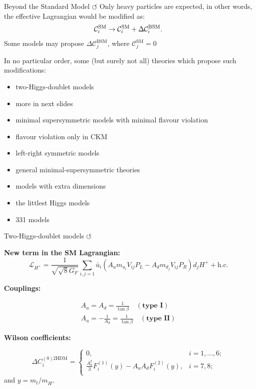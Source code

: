 \documentclass[xcolor=dvipsnames]{beamer}
\begin{document}
\begin{frame}{Beyond the Standard Model \hyperlink{frame:A}{$\circlearrowleft$}}
   \scriptsize
   Only heavy particles are expected, in other words, the effective Lagrangian would be modified as:
   \begin{equation}\nonumber
      \mathcal{C}_i^{\mathrm{SM}} \rightarrow \mathcal{C}_i^{\mathrm{SM}} + \Delta\mathcal{C}_i^{\mathrm{BSM}}.
   \end{equation}
   Some models may propose $\Delta\mathcal{C}_j^{\mathrm{BSM}}$, where $\mathcal{C}_j^{\mathrm{SM}}=0$

\vspace{10pt}
   In no particular order, some (but surely not all) theories which propose such modifications:
   \begin{itemize}
      \item two-Higgs-doublet models 
      \item[\ra] more in next slides
      \item minimal supersymmetric models with minimal flavour violation
      \item[\ra] flavour violation only in CKM
      \item left-right symmetric models
      \item general minimal-supersymmetric theories
      \item models with extra dimensions
      \item the littlest Higgs models
      \item 331 models
   \end{itemize}
\end{frame}

\begin{frame}{Two-Higgs-doublet models \hyperlink{frame:A}{$\circlearrowleft$}}

   \scriptsize

   \textbf{New term in the SM Lagrangian:}
   \begin{equation*}
      \mathcal{L}_{H^+} = \frac{1}{\sqrt{\sqrt8G_F}} \sum_{i,j=1} \bar{u}_i (A_u m_{u_i}V_{ij}P_L - A_d m_{d_j}V_{ij}P_R)d_jH^+ + \mathrm{h.c}.
  \end{equation*}

  \textbf{Couplings:}

\begin{align*}
A_u = A_d = \frac{1}{\tan\beta} \quad (\textbf{type I})\\
A_u = - \frac{1}{A_d} = \frac{1}{\tan\beta} \quad  (\textbf{type II})
\end{align*}

\textbf{Wilson coefficients:}

\begin{equation*}\label{eq:partial_wilson_2hdm}
   \Delta C_i^{(0)\text{2HDM}} = 
   \begin{cases}
       0, & i=1,...,6;\\
       \frac{A_u^2}{3}F_i^{(1)}(y) - A_uA_dF_i^{(2)}(y), & i=7,8;\\
   \end{cases}
\end{equation*}
and $y = m_t/m_{H^+}$
\end{frame}
\end{document}
